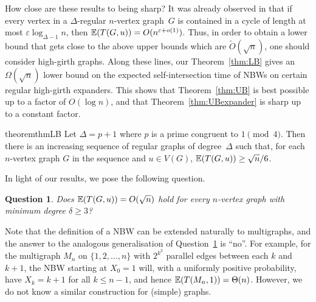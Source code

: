 \documentclass[11pt,a4paper]{article}
\theoremstyle{plain}
\newtheorem{question}[theorem]{Question}
\newcommand{\Exp}{\mathop{\null\mathbb{E}}}
\let\epsilon=\varepsilon
\begin{document}
How close are these results to being sharp? It was already observed in \cite[Remark 3.5]{ABLS} that if every vertex in a $\Delta$-regular $n$-vertex graph~$G$ is contained in a cycle of length at most $\epsilon \log_{\Delta-1} n$, then $\Exp(T(G,u)) = O(n^{\epsilon+o(1)})$. 
Thus, in order to obtain a lower bound that gets close to the above upper bounds which are $\widetilde{O}(\sqrt{n})$, one should consider high-girth graphs. Along these lines, our Theorem~\ref{thm:LB} gives an $\Omega(\sqrt{n})$ lower bound on the expected self-intersection time of NBWs on certain regular high-girth expanders. This shows that Theorem~\ref{thm:UB} is best possible up to a factor of $O(\log n)$, and that Theorem~\ref{thm:UBexpander} is sharp up to a constant factor.
 
\begin{restatable}{theorem}{thmLB}\label{thm:LB}
Let $\Delta=p+1$ where $p$ is a prime congruent to $1 \pmod4$.  Then there is an increasing sequence of regular graphs of degree~$\Delta$ such that, for each $n$-vertex graph $G$ in the sequence
and $u\in V(G)$, $\Exp(T(G,u)) \geq \sqrt{n}/6$.
\end{restatable}

In light of our results, we pose the following question.

\begin{question}\label{thequestion}
Does  $\Exp(T(G,u))=O(\sqrt{n})$ hold for every $n$-vertex  graph with minimum degree $\delta \ge 3$?
\end{question}

Note that the definition of a NBW can be extended naturally to multigraphs, and the answer to  
the analogous generalisation of
Question~\ref{thequestion} is ``no''. For example,   for the multigraph $M_n$ on $\{1,2,\dots,n\}$ with $2^{k^2}$ parallel edges between each
$k$ and $k+1$, the NBW starting at $X_0=1$ will, with a uniformly positive probability, have $X_k=k+1$ for all $k\leq n-1$, and hence $\Exp(T(M_n,1))=\Theta(n)$.
However, we do not know a similar construction for (simple) graphs.
\end{document}
